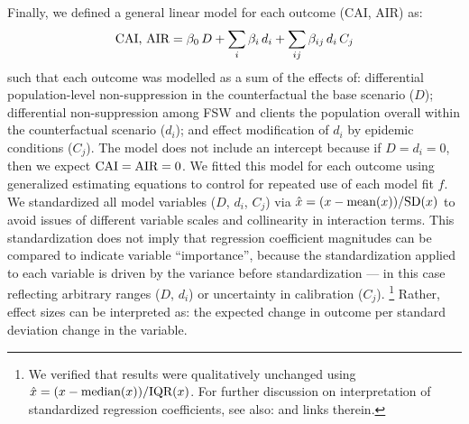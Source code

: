 \par
Finally, we defined a general linear model for each outcome (CAI, AIR) as:
\begin{equation}\label{eq:art.2.glm}
  \textnormal{CAI, AIR} = \beta_0\,D
                 + \sum_i \beta_i\,d_i
                 + \sum_{ij} \beta_{ij}\,d_i\,C_j
\end{equation}
such that each outcome was modelled as a sum of the effects of:
differential population-level non-suppression in the counterfactual \vs the base scenario ($D$);
differential non-suppression among FSW and clients
\vs the population overall within the counterfactual scenario ($d_i$); and
effect modification of $d_i$ by epidemic conditions ($C_j$).
The model does not include an intercept because if $D = d_i = 0$,
then we expect $\textnormal{CAI} = \textnormal{AIR} = 0$.
We fitted this model for each outcome using generalized estimating equations \cite{Hojsgaard2006}
to control for repeated use of each model fit $f$.
We standardized all model variables ($D$, $d_i$, $C_j$) via
$\hat{x} = (x - \textnormal{mean}(x)) / \textnormal{SD}(x)$
to avoid issues of different variable scales and collinearity in interaction terms.
This standardization does not imply that
regression coefficient magnitudes can be compared to indicate variable ``importance'',
because the standardization applied to each variable is driven
by the variance before standardization
--- in this case reflecting arbitrary ranges ($D$, $d_i$) or uncertainty in calibration ($C_j$).%
\footnote{We verified that results were qualitatively unchanged using
  $\hat{x} = (x - \textnormal{median}(x)) / \textnormal{IQR}(x)$.
  For further discussion on interpretation of standardized regression coefficients,
  see also:  and links therein.}
Rather, effect sizes can be interpreted as:
the expected change in outcome per standard deviation change in the variable.
